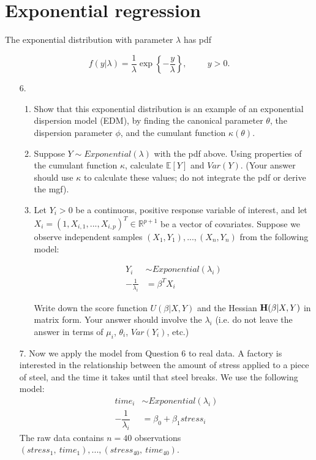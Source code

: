 \documentclass[11pt]{article}
\begin{document}
\newpage

\section*{Exponential regression}

The exponential distribution with parameter $\lambda$ has pdf

$$f(y | \lambda) = \frac{1}{\lambda} \exp\left\lbrace - \frac{y}{\lambda} \right\rbrace, \hspace{1cm} y > 0.$$

\begin{enumerate}
\item[6.] 
\begin{enumerate}
\item Show that this exponential distribution is an example of an exponential dispersion model (EDM), by finding the canonical parameter $\theta$, the dispersion parameter $\phi$, and the cumulant function $\kappa(\theta)$.

\item Suppose $Y \sim Exponential(\lambda)$ with the pdf above. Using properties of the cumulant function $\kappa$, calculate $\mathbb{E}[Y]$ and $Var(Y)$. (Your answer should use $\kappa$ to calculate these values; do not integrate the pdf or derive the mgf).

\item Let $Y_i > 0$ be a continuous, positive response variable of interest, and let $X_i = (1, X_{i,1},...,X_{i,p})^T \in \mathbb{R}^{p+1}$ be a vector of covariates. Suppose we observe independent samples $(X_1, Y_1),...,(X_n, Y_n)$ from the following model:

\begin{align*}
Y_i &\sim Exponential(\lambda_i) \\
-\frac{1}{\lambda_i} &= \beta^T X_i
\end{align*}

Write down the score function $U(\beta | X, Y)$ and the Hessian ${\bf H}(\beta | X, Y)$ in matrix form. Your answer should involve the $\lambda_i$ (i.e. do not leave the answer in terms of $\mu_i$, $\theta_i$, $Var(Y_i)$, etc.)
\end{enumerate}

\item[7.] Now we apply the model from Question 6 to real data. A factory is interested in the relationship between the amount of stress applied to a piece of steel, and the time it takes until that steel breaks. We use the following model:
\begin{align*}
time_i &\sim Exponential(\lambda_i) \\
-\dfrac{1}{\lambda_i} &= \beta_0 + \beta_1 stress_i
\end{align*}
The raw data contains $n = 40$ observations $(stress_1, \ time_1),...,(stress_{40}, \ time_{40})$.\\


\end{enumerate}
\end{document}
